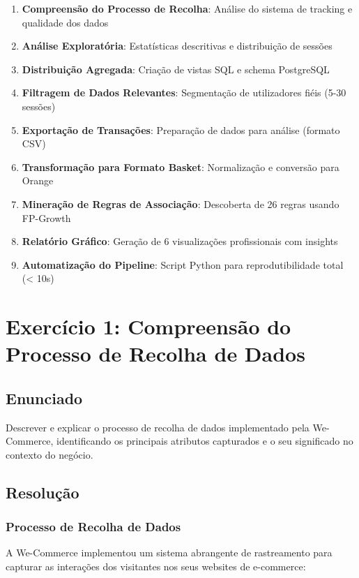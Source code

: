 \documentclass[11pt,a4paper]{article}
\begin{document}
\begin{enumerate}
    \item \textbf{Compreensão do Processo de Recolha}: Análise do sistema de tracking e qualidade dos dados
    \item \textbf{Análise Exploratória}: Estatísticas descritivas e distribuição de sessões
    \item \textbf{Distribuição Agregada}: Criação de vistas SQL e schema PostgreSQL
    \item \textbf{Filtragem de Dados Relevantes}: Segmentação de utilizadores fiéis (5-30 sessões)
    \item \textbf{Exportação de Transações}: Preparação de dados para análise (formato CSV)
    \item \textbf{Transformação para Formato Basket}: Normalização e conversão para Orange
    \item \textbf{Mineração de Regras de Associação}: Descoberta de 26 regras usando FP-Growth
    \item \textbf{Relatório Gráfico}: Geração de 6 visualizações profissionais com insights
    \item \textbf{Automatização do Pipeline}: Script Python para reprodutibilidade total (< 10s)
\end{enumerate}

\newpage

\section{Exercício 1: Compreensão do Processo de Recolha de Dados}

\subsection{Enunciado}

Descrever e explicar o processo de recolha de dados implementado pela We-Commerce, identificando os principais atributos capturados e o seu significado no contexto do negócio.

\subsection{Resolução}

\subsubsection{Processo de Recolha de Dados}

A We-Commerce implementou um sistema abrangente de rastreamento para capturar as interações dos visitantes nos seus websites de e-commerce:
\end{document}
